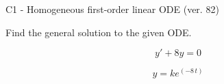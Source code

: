 \begin{exercise}
  \begin{exerciseTitle}C1 - Homogeneous first-order linear ODE (ver. 82)\end{exerciseTitle}
  \begin{exerciseStatement}
    
Find the general solution to the given ODE.

    
\[y'+8y=0\]

  \end{exerciseStatement}
  \begin{exerciseAnswer}
    
\[y= k e^{\left(-8 \, t\right)}\]

  \end{exerciseAnswer}
\end{exercise}